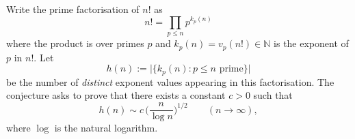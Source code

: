 \\
Write the prime factorisation of $n!$ as
\[
 n! = \prod_{p\le n} p^{k_p(n)}
\]
where the product is over primes $p$ and $k_p(n)=v_p(n!)\in\mathbb{N}$ is the exponent of $p$ in $n!$. Let
\[
 h(n):=\big|\{k_p(n): p\le n\text{ prime}\}\big|
\]
be the number of \emph{distinct} exponent values appearing in this factorisation. The conjecture asks to prove that there exists a constant $c>0$ such that
\[
 h(n) \sim c\,\Big(\frac{n}{\log n}\Big)^{1/2}\qquad (n\to\infty),
\]
where $\log$ is the natural logarithm.
